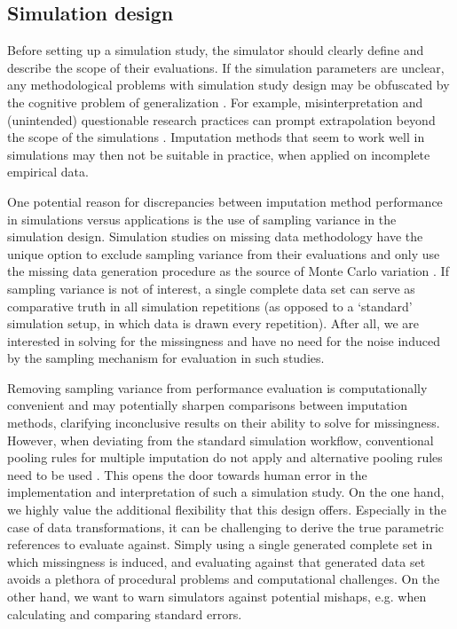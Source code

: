 \documentclass[bimj,fleqn]{w-art}
\begin{document}

\subsection{Simulation design}

Before setting up a simulation study, the simulator should clearly define and describe the scope of their evaluations. If the simulation parameters are unclear, any methodological problems with simulation study design may be obfuscated by the cognitive problem of generalization \citep{gree17}. For example, misinterpretation and (unintended) questionable research practices can prompt extrapolation beyond the scope of the simulations \citep{gree17, pawe22}. Imputation methods that seem to work well in simulations may then not be suitable in practice, when applied on incomplete empirical data.

One potential reason for discrepancies between imputation method performance in simulations versus applications is the use of sampling variance in the simulation design. Simulation studies on missing data methodology have the unique option to exclude sampling variance from their evaluations and only use the missing data generation procedure as the source of Monte Carlo variation \citep{vink14}. If sampling variance is not of interest, a single complete data set can serve as comparative truth in all simulation repetitions (as opposed to a `standard' simulation setup, in which data is drawn every repetition). After all, we are interested in solving for the missingness and have no need for the noise induced by the sampling mechanism for evaluation in such studies. 

Removing sampling variance from performance evaluation is computationally convenient and may potentially sharpen comparisons between imputation methods, clarifying inconclusive results on their ability to solve for missingness. However, when deviating from the standard simulation workflow, conventional pooling rules for multiple imputation \citep[cf.][p. 76-77]{rubi87} do not apply and alternative pooling rules need to be used \citep{raghunathan2003multiple,vink14}. This opens the door towards human error in the implementation and interpretation of such a simulation study. On the one hand, we highly value the additional flexibility that this design offers. Especially in the case of data transformations, it can be challenging to derive the true parametric references to evaluate against. Simply using a single generated complete set in which missingness is induced, and evaluating against that generated data set avoids a plethora of procedural problems and computational challenges. On the other hand, we want to warn simulators against potential mishaps, e.g. when calculating and comparing standard errors.
\end{document}
